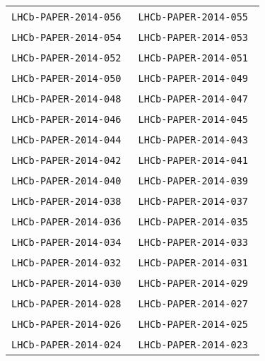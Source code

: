 \begin{center}
\begin{longtable}{ll}
\texttt{LHCb-PAPER-2014-056}~\cite{LHCb-PAPER-2014-056} &
\texttt{LHCb-PAPER-2014-055}~\cite{LHCb-PAPER-2014-055} \\
\texttt{LHCb-PAPER-2014-054}~\cite{LHCb-PAPER-2014-054} &
\texttt{LHCb-PAPER-2014-053}~\cite{LHCb-PAPER-2014-053} \\
\texttt{LHCb-PAPER-2014-052}~\cite{LHCb-PAPER-2014-052} &
\texttt{LHCb-PAPER-2014-051}~\cite{LHCb-PAPER-2014-051} \\
\texttt{LHCb-PAPER-2014-050}~\cite{LHCb-PAPER-2014-050} &
\texttt{LHCb-PAPER-2014-049}~\cite{LHCb-PAPER-2014-049} \\
\texttt{LHCb-PAPER-2014-048}~\cite{LHCb-PAPER-2014-048} &
\texttt{LHCb-PAPER-2014-047}~\cite{LHCb-PAPER-2014-047} \\
\texttt{LHCb-PAPER-2014-046}~\cite{LHCb-PAPER-2014-046} &
\texttt{LHCb-PAPER-2014-045}~\cite{LHCb-PAPER-2014-045} \\
\texttt{LHCb-PAPER-2014-044}~\cite{LHCb-PAPER-2014-044} &
\texttt{LHCb-PAPER-2014-043}~\cite{LHCb-PAPER-2014-043} \\
\texttt{LHCb-PAPER-2014-042}~\cite{LHCb-PAPER-2014-042} &
\texttt{LHCb-PAPER-2014-041}~\cite{LHCb-PAPER-2014-041} \\
\texttt{LHCb-PAPER-2014-040}~\cite{LHCb-PAPER-2014-040} &
\texttt{LHCb-PAPER-2014-039}~\cite{LHCb-PAPER-2014-039} \\
\texttt{LHCb-PAPER-2014-038}~\cite{LHCb-PAPER-2014-038} &
\texttt{LHCb-PAPER-2014-037}~\cite{LHCb-PAPER-2014-037} \\
\texttt{LHCb-PAPER-2014-036}~\cite{LHCb-PAPER-2014-036} &
\texttt{LHCb-PAPER-2014-035}~\cite{LHCb-PAPER-2014-035} \\
\texttt{LHCb-PAPER-2014-034}~\cite{LHCb-PAPER-2014-034} &
\texttt{LHCb-PAPER-2014-033}~\cite{LHCb-PAPER-2014-033} \\
\texttt{LHCb-PAPER-2014-032}~\cite{LHCb-PAPER-2014-032} &
\texttt{LHCb-PAPER-2014-031}~\cite{LHCb-PAPER-2014-031} \\
\texttt{LHCb-PAPER-2014-030}~\cite{LHCb-PAPER-2014-030} &
\texttt{LHCb-PAPER-2014-029}~\cite{LHCb-PAPER-2014-029} \\
\texttt{LHCb-PAPER-2014-028}~\cite{LHCb-PAPER-2014-028} &
\texttt{LHCb-PAPER-2014-027}~\cite{LHCb-PAPER-2014-027} \\
\texttt{LHCb-PAPER-2014-026}~\cite{LHCb-PAPER-2014-026} &
\texttt{LHCb-PAPER-2014-025}~\cite{LHCb-PAPER-2014-025} \\
\texttt{LHCb-PAPER-2014-024}~\cite{LHCb-PAPER-2014-024} &
\texttt{LHCb-PAPER-2014-023}~\cite{LHCb-PAPER-2014-023} \\

\end{longtable}
\end{center}
